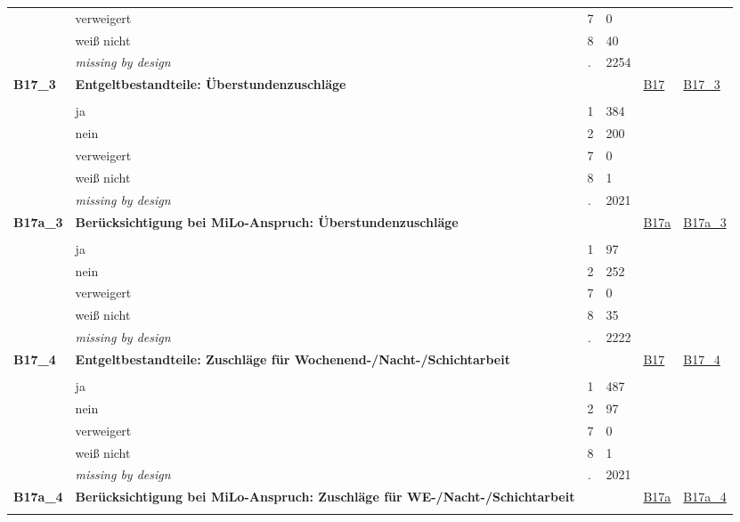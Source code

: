 \begin{longtable}{| L{2.45cm} | L{6cm} | C{1.5cm} | R{1cm} | C{2.25cm} | C{2.25cm} |}
   & verweigert & 7 & 0 &  &  \\ 
   & weiß nicht & 8 & 40 &  &  \\ 
   & \textit{missing by design} & \textit{.} & 2254 &  &  \\ 
   \midrule
\textbf{B17\_3}\label{var:B17:3} & \textbf{Entgeltbestandteile: Überstundenzuschläge} &  &  & \hyperref[B17]{B17} & \hyperref[var:suf:B17:3]{B17\_3} \\ 
   &  &  &  &  &  \\ 
   & ja & 1 & 384 &  &  \\ 
   & nein & 2 & 200 &  &  \\ 
   & verweigert & 7 & 0 &  &  \\ 
   & weiß nicht & 8 & 1 &  &  \\ 
   & \textit{missing by design} & \textit{.} & 2021 &  &  \\ 
   \midrule
\textbf{B17a\_3}\label{var:B17a:3} & \textbf{Berücksichtigung bei MiLo-Anspruch: Überstundenzuschläge} &  &  & \hyperref[B17a]{B17a} & \hyperref[var:suf:B17a:3]{B17a\_3} \\ 
   &  &  &  &  &  \\ 
   & ja & 1 & 97 &  &  \\ 
   & nein & 2 & 252 &  &  \\ 
   & verweigert & 7 & 0 &  &  \\ 
   & weiß nicht & 8 & 35 &  &  \\ 
   & \textit{missing by design} & \textit{.} & 2222 &  &  \\ 
   \midrule
\textbf{B17\_4}\label{var:B17:4} & \textbf{Entgeltbestandteile: Zuschläge für Wochenend-/Nacht-/Schichtarbeit} &  &  & \hyperref[B17]{B17} & \hyperref[var:suf:B17:4]{B17\_4} \\ 
   &  &  &  &  &  \\ 
   & ja & 1 & 487 &  &  \\ 
   & nein & 2 & 97 &  &  \\ 
   & verweigert & 7 & 0 &  &  \\ 
   & weiß nicht & 8 & 1 &  &  \\ 
   & \textit{missing by design} & \textit{.} & 2021 &  &  \\ 
   \midrule
\textbf{B17a\_4}\label{var:B17a:4} & \textbf{Berücksichtigung bei MiLo-Anspruch: Zuschläge für WE-/Nacht-/Schichtarbeit} &  &  & \hyperref[B17a]{B17a} & \hyperref[var:suf:B17a:4]{B17a\_4} \\ 
   &  &  &  &  &  \\ 

\end{longtable}
